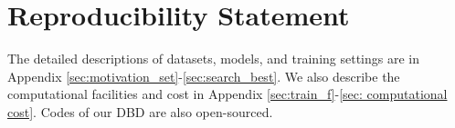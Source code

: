 \section*{Reproducibility Statement}
The detailed descriptions of datasets, models, and training settings are in Appendix \ref{sec:motivation_set}-\ref{sec:search_best}. We also describe the computational facilities and cost in Appendix \ref{sec:train_f}-\ref{sec: computational cost}. Codes of our DBD are also open-sourced.

\newpage

